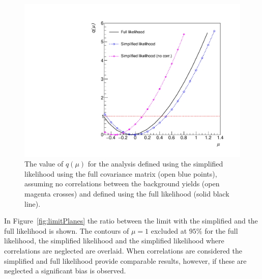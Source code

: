 \begin{figure}[hbt]
  \begin{center} 
   \includegraphics[width=1.5\cmsFigWidth]{figures/alphaT/rAT.pdf}
   \caption{The value of $q(\mu)$ for the \alphaT analysis defined using the simplified likelihood using the full covariance matrix (open blue points), assuming no correlations between the 
   background yields (open magenta crosses) and defined using the full likelihood (solid black line).}
   \label{fig:likelihoodscanAT} 
  \end{center}
\end{figure}

In Figure~\ref{fig:limitPlanes} the ratio between the limit with the simplified and the full likelihood is shown.
The contours of $\mu=1$ excluded at $95\%$ for the full likelihood, the simplified likelihood
and the simplified likelihood where correlations are neglected are overlaid. When correlations
are considered the simplified and full likelihood provide comparable results, however, if 
these are neglected a significant bias is observed.

